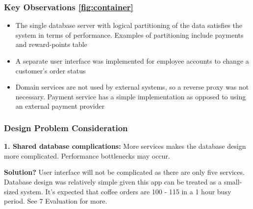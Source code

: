 \documentclass{article}
\begin{document}
\subsubsection*{Key Observations \ref{fig:container}} 
\begin{itemize}
    \item The single database server with logical partitioning of the data satisfies the system in terms of performance. Examples of partitioning include payments and reward-points table
    \item A separate user interface was implemented for employee accounts to change a customer's order status
    \item Domain services are not used by external systems, so a reverse proxy was not necessary. Payment service has a simple implementation as opposed to using an external payment provider 
\end{itemize}

\subsubsection*{Design Problem Consideration}
\bigskip \hfill \begin{minipage}{\dimexpr\textwidth-0.5cm}
\textbf{1. Shared database complications:} More services makes the database design more complicated. Performance bottlenecks may occur. 

\medskip \textbf{Solution?} User interface will not be complicated as there are only five services. Database design was relatively simple given this app can be treated as a small-sized system. It's expected that coffee orders are 100 - 115 in a 1 hour busy period. See 7 Evaluation for more.
\end{minipage}
\end{document}
